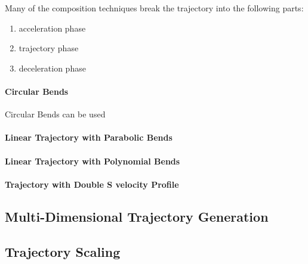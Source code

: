 			Many of the composition techniques break the trajectory into the
			following parts:

			\begin{enumerate}

				\item acceleration phase

				\item trajectory phase

				\item deceleration phase

			\end{enumerate}

			\paragraph{Circular Bends}

				Circular Bends can be used

			\paragraph{Linear Trajectory with Parabolic Bends}

			\paragraph{Linear Trajectory with Polynomial Bends}

			\paragraph{Trajectory with Double S velocity Profile}

	\subsection{Multi-Dimensional Trajectory Generation}%
	\label{sec:multi_dimensional_trajectory_generation}


	\subsection{Trajectory Scaling}%
	\label{sec:trajectory_scaling}

